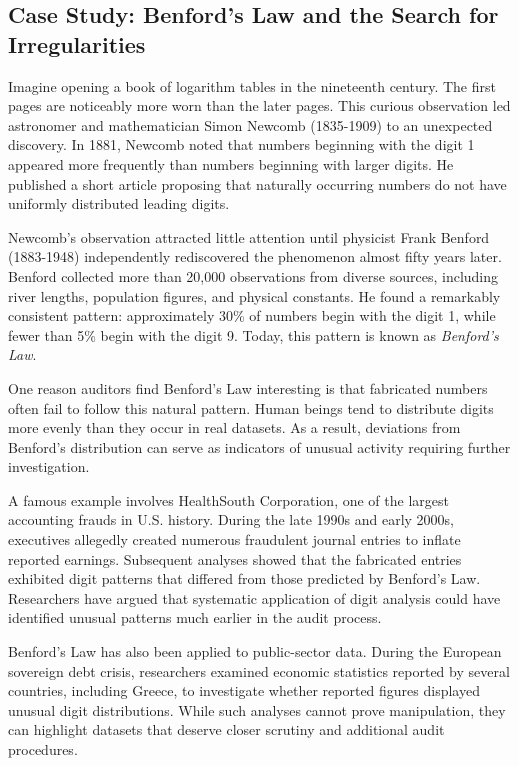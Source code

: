 \begin{mdframed}[hidealllines=true,backgroundcolor=ada_blue!20]
\section*{Case Study: Benford's Law and the Search for Irregularities}
\sloppy

Imagine opening a book of logarithm tables in the nineteenth century. The first pages are noticeably more worn than the later pages. This curious observation led astronomer and mathematician Simon Newcomb (1835-1909) to an unexpected discovery. In 1881, Newcomb noted that numbers beginning with the digit 1 appeared more frequently than numbers beginning with larger digits. He published a short article proposing that naturally occurring numbers do not have uniformly distributed leading digits.

Newcomb's observation attracted little attention until physicist Frank Benford (1883-1948) independently rediscovered the phenomenon almost fifty years later. Benford collected more than 20,000 observations from diverse sources, including river lengths, population figures, and physical constants. He found a remarkably consistent pattern: approximately 30\% of numbers begin with the digit 1, while fewer than 5\% begin with the digit 9. Today, this pattern is known as \emph{Benford's Law}.

One reason auditors find Benford's Law interesting is that fabricated numbers often fail to follow this natural pattern. Human beings tend to distribute digits more evenly than they occur in real datasets. As a result, deviations from Benford's distribution can serve as indicators of unusual activity requiring further investigation.

A famous example involves HealthSouth Corporation, one of the largest accounting frauds in U.S. history. During the late 1990s and early 2000s, executives allegedly created numerous fraudulent journal entries to inflate reported earnings. Subsequent analyses showed that the fabricated entries exhibited digit patterns that differed from those predicted by Benford's Law. Researchers have argued that systematic application of digit analysis could have identified unusual patterns much earlier in the audit process.

Benford's Law has also been applied to public-sector data. During the European sovereign debt crisis, researchers examined economic statistics reported by several countries, including Greece, to investigate whether reported figures displayed unusual digit distributions. While such analyses cannot prove manipulation, they can highlight datasets that deserve closer scrutiny and additional audit procedures.


\end{mdframed}
